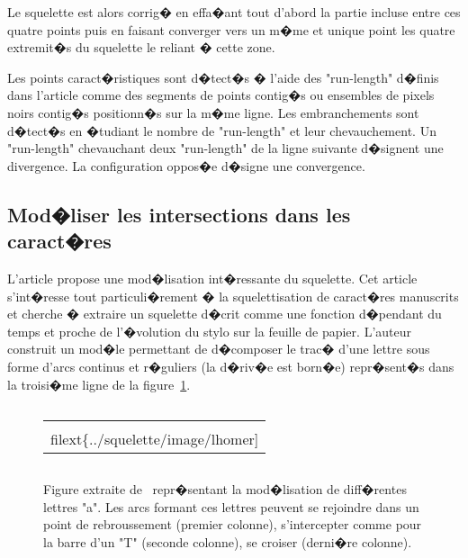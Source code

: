 
Le squelette est alors corrig� en effa�ant tout d'abord la partie incluse entre ces quatre points puis en faisant converger vers un m�me et unique point les quatre extremit�s du squelette le reliant � cette zone.

Les points caract�ristiques sont d�tect�s � l'aide des "run-length" d�finis dans l'article comme des segments de points contig�s ou  ensembles de pixels noirs contig�s positionn�s sur la m�me ligne. Les embranchements sont d�tect�s en �tudiant le nombre de "run-length" et leur chevauchement. Un "run-length" chevauchant deux "run-length" de la ligne suivante d�signent une divergence. La configuration oppos�e d�signe une convergence.









\subsection{Mod�liser les intersections dans les caract�res}
\label{squelette_modelisation_intersection_modele}

L'article  propose une mod�lisation int�ressante du squelette. Cet article s'int�resse tout particuli�rement � la squelettisation de caract�res manuscrits et cherche � extraire un squelette d�crit comme une fonction d�pendant du temps et proche de l'�volution du stylo sur la feuille de papier. L'auteur construit un mod�le permettant de d�composer le trac� d'une lettre sous forme d'arcs continus et r�guliers (la d�riv�e est born�e) repr�sent�s dans la troisi�me ligne de la figure~\ref{squelette_lhomer_intersection}. 

            \begin{figure}[ht]
        $$\begin{tabular}{|c|} \hline
        \texttt{[image: \\filext\{../squelette/image/lhomer]}}
        \\ \hline \end{tabular}$$
        \caption{    Figure extraite de~ repr�sentant la mod�lisation de diff�rentes lettres "a".
                            Les arcs formant ces lettres peuvent se rejoindre dans un point de rebroussement (premier colonne),
                            s'intercepter comme pour la barre d'un "T" (seconde colonne), se croiser (derni�re colonne).}
        \label{squelette_lhomer_intersection}
            \end{figure}


